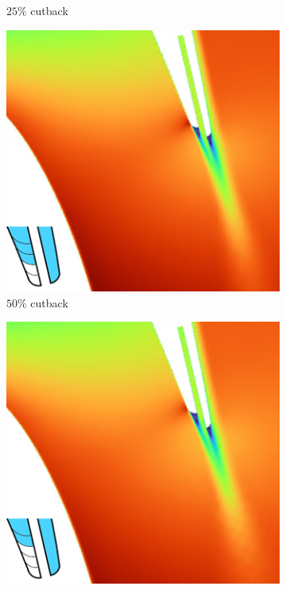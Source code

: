 \documentclass[a4paper, 11pt, oneside]{report}
\begin{document}
\begin{figure}[H]
\begin{subfigure}{.42\textwidth}
		\caption{$25\%$ cutback}
		\vspace{0.018\textheight}
	\end{subfigure}
	\begin{subfigure}{.42\textwidth}
		\centering
		\includegraphics[width=\linewidth]{figs/ps_cutbacks_design_50.png}
		\caption{$50\%$ cutback}
		\vspace{0.018\textheight}
	\end{subfigure}
	\hspace{0.05\textwidth}
	\begin{subfigure}{.42\textwidth}
		\centering
		\includegraphics[width=\linewidth]{figs/ps_cutbacks_design_75.png}

\end{subfigure}
\end{figure}
\end{document}
